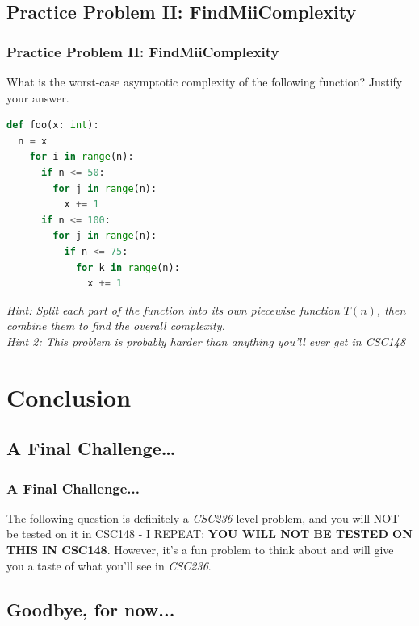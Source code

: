 \documentclass[hyperref={colorlinks,citecolor=blue,linkcolor=blue,urlcolor=blue}, aspectratio=1610]{beamer}
\begin{document}
\subsection{Practice Problem II: FindMiiComplexity}
\begin{frame}[fragile]
  \frametitle{Practice Problem II: FindMiiComplexity}
  What is the worst-case asymptotic complexity of the following function? Justify your answer.
  \begin{lstlisting}[language=Python,style=mystyle]
def foo(x: int):
  n = x
    for i in range(n):
      if n <= 50:
        for j in range(n):
          x += 1
      if n <= 100:
        for j in range(n):
          if n <= 75:
            for k in range(n):
              x += 1
  \end{lstlisting}
  \textit{Hint: Split each part of the function into its own piecewise function $T(n)$, then combine them to find the overall complexity.}\\
  \textit{Hint 2: This problem is probably harder than anything you'll ever get in CSC148}\\
\end{frame}

\section{Conclusion}

\subsection{A Final Challenge\dots}
\begin{frame}
  \frametitle{A Final Challenge...}
  The following question is definitely a \textit{CSC236}-level problem, and you will NOT be tested on it in CSC148 - I REPEAT: \textbf{YOU WILL NOT BE TESTED ON THIS IN CSC148}. However, it's a fun problem to think about and will give you a taste of what you'll see in \textit{CSC236}.\\
\end{frame}

\subsection{Goodbye, for now...}
\end{document}
